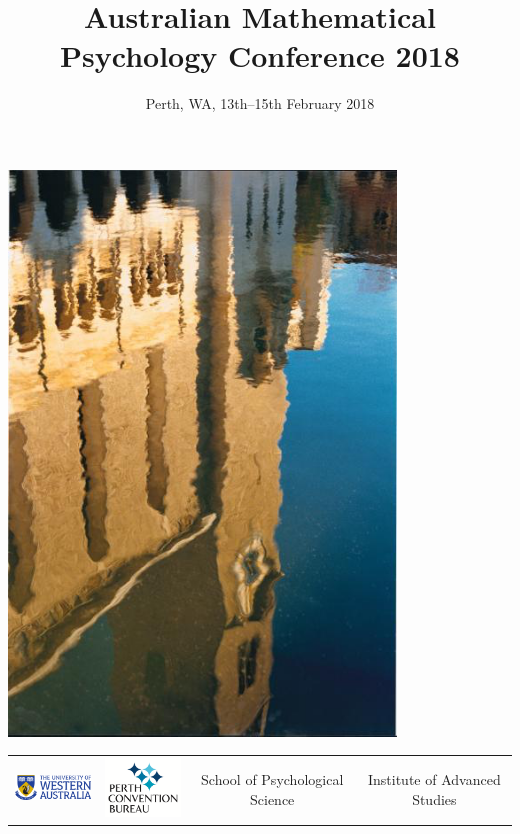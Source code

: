 \documentclass[]{article}
\title{Australian Mathematical Psychology Conference 2018}
\author{}
\date{Perth, WA, 13th--15th February 2018}
\begin{document}
\maketitle

\renewcommand{\arraystretch}{1.5}

\begin{center}
\includegraphics[height=15cm]{images/reflection.png}
\begin{table}[b]
\begin{tabular}{cccc}
\includegraphics[width=3cm]{images/UWA-Full-Hor-CMYK.png}&
\includegraphics[width=3cm]{images/PCB.png}&
School of Psychological Science &
Institute of Advanced Studies
\end{tabular}
\end{table}
\end{center}
\end{document}
